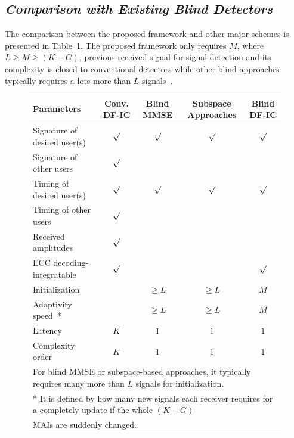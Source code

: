 \documentclass[a4paper,10pt,fleqn, twocolumn]{IEEETran}
\begin{document}
\subsection{\em Comparison with Existing Blind Detectors}
The comparison between the proposed framework and other major
schemes is presented in Table~1. The proposed framework only
requires $M$, where $L\ge M\ge (K-G)$, previous received signal
for signal detection and its complexity is closed to conventional
detectors while other blind approaches typically requires a lots
more than $L$ signals~\cite{Madh94,Wang98,Zhang02}.
\begin{figure}[t]\label{SchemComp}
\begin{center}
\begin{tabular}{lcccc}
Parameters & Conv. DF-IC & Blind MMSE & Subspace Approaches & Blind DF-IC\\
\hline
\hline
Signature of desired user(s) & $\mathbf\surd$ & $\mathbf\surd$ &  $\mathbf\surd$ & $\mathbf\surd$ \\
Signature of other users & $\mathbf\surd$ & &  \\
Timing of desired user(s)  & $\mathbf\surd$ & $\mathbf\surd$ & $\mathbf\surd$ & $\mathbf\surd$ \\
Timing of other users  & $\mathbf\surd$ & & & \\
Received amplitudes  & $\mathbf\surd$ & &  &\\
ECC decoding-integratable& $\mathbf\surd$ &&& $\mathbf\surd$ \\
Initialization~{\small *} &  & $\ge L$ & $\ge L$ & $M$\\
Adaptivity speed~{\small **} &  & $\ge L$ & $\ge L$ & $M$\\
Latency & $K$ & $1$ & $1$ & $1$ \\
Complexity order & $K$ & $1$ & $1$ & $1$ \\
\hline \hline
\multicolumn{5}{l}{\small * For blind MMSE or
subspace-based
approaches, it typically requires many more than $L$ signals for initialization.}\\
\multicolumn{5}{l}{\small ** It is defined by how many new signals
each receiver requires for a completely update if the whole $(K-G)$}\\
\multicolumn{5}{l}{\small MAIs are suddenly changed.}
\end{tabular}
\end{center}
\end{figure}
\end{document}
